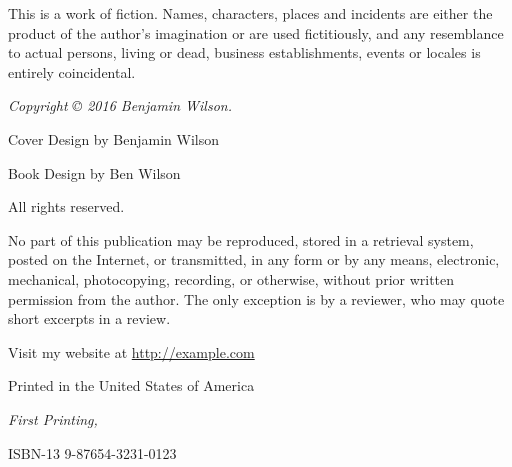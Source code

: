\documentclass[11pt,twoside,makeidx,hidelinks,]{memoir}
\begin{document}
  

  \par\noindent This is a work of fiction. Names, characters, places and incidents are either
  the product of the author's imagination or are used fictitiously, and any resemblance to
  actual persons, living or dead, business establishments, events or locales is entirely
  coincidental.\newline
  

  \par\noindent\emph{Copyright \copyright{} 2016 Benjamin Wilson.}\newline

  
  \par\noindent Cover Design by Benjamin Wilson\newline
  

  
  \par\noindent Book Design by Ben Wilson\newline
  

  


  \par\noindent All rights reserved.\newline

  \par\noindent No part of this publication may be reproduced, stored in a retrieval system, posted on the Internet, or transmitted, in any form or by any means, electronic, mechanical, photocopying, recording, or otherwise, without prior written permission from the author. The only exception is by a reviewer, who may quote short excerpts in a review.\newline

  \par\noindent \theauthor
  \par\noindent Visit my website at \url{http://example.com}\newline

  \par\noindent Printed in the United States of America
  \newline

  \par\noindent\textit{First Printing, \usmonthyear{}}
  \newline

  \par\noindent ISBN-13 9-87654-3231-0123
  \vspace*{\fill}
\end{document}
